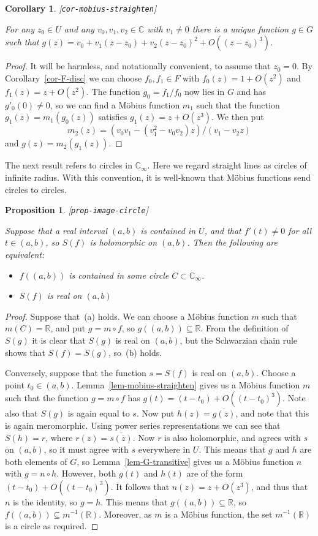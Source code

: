 \documentclass[reqno]{amsart}
\newcommand{\lbl}[1]{\label{#1}\textup{[\texttt{#1}]}\par}
\newcommand{\lbl}{\label}
\newcommand{\R}         {{\mathbb{R}}}
\newcommand{\C}         {{\mathbb{C}}}
\newcommand{\ov}[1]     {\overline{#1}}
\newcommand{\sse}       {\subseteq}
\renewcommand{\:}{\colon}
\newtheorem{proposition}[theorem]{Proposition}
\newtheorem{corollary}[theorem]{Corollary}
\theoremstyle{definition}
\begin{document}
\begin{corollary}\lbl{cor-mobius-straighten}
 For any $z_0\in U$ and any $v_0,v_1,v_2\in\C$ with $v_1\neq 0$ there
 is a unique function $g\in G$ such that
 $g(z)=v_0+v_1(z-z_0)+v_2(z-z_0)^2+O((z-z_0)^3)$.
\end{corollary}
\begin{proof}
 It will be harmless, and notationally convenient, to assume that
 $z_0=0$.  By Corollary~\ref{cor-F-disc} we can choose
 $f_0,f_1\in F$ with $f_0(z)=1+O(z^2)$ and $f_1(z)=z+O(z^2)$.  The
 function $g_0=f_1/f_0$ now lies in $G$ and has $g'_0(0)\neq 0$, so we
 can find a M\"obius function $m_1$ such that the function
 $g_1(z)=m_1(g_0(z))$ satisfies $g_1(z)=z+O(z^3)$.  We then put
 \[ m_2(z)=(v_0v_1-(v_1^2-v_0v_2)z)/(v_1-v_2z) \]
 and $g(z)=m_2(g_1(z))$.
\end{proof}

The next result refers to circles in $\C_\infty$.  Here we regard
straight lines as circles of infinite radius.  With this convention,
it is well-known that M\"obius functions send circles to circles.
\begin{proposition}\lbl{prop-image-circle}
 Suppose that a real interval $(a,b)$ is contained in $U$, and that
 $f'(t)\neq 0$ for all $t\in(a,b)$, so $S(f)$ is holomorphic on
 $(a,b)$.  Then the following are equivalent:
 \begin{itemize}
  \item[(a)] $f((a,b))$ is contained in some circle
   $C\subset\C_\infty$.
  \item[(b)] $S(f)$ is real on $(a,b)$
 \end{itemize}
\end{proposition}
\begin{proof}
 Suppose that~(a) holds.  We can choose a M\"obius function $m$ such
 that $m(C)=\R$, and put $g=m\circ f$, so $g((a,b))\sse\R$.  From the
 definition of $S(g)$ it is clear that $S(g)$ is real on $(a,b)$, but
 the Schwarzian chain rule shows that $S(f)=S(g)$, so~(b) holds.

 Conversely, suppose that the function $s=S(f)$ is real on $(a,b)$.
 Choose a point $t_0\in(a,b)$.  Lemma~\ref{lem-mobius-straighten}
 gives us a M\"obius function $m$ such that the function $g=m\circ f$
 has $g(t)=(t-t_0)+O((t-t_0)^3)$.  Note also that $S(g)$ is again
 equal to $s$.  Now put $h(z)=\ov{g(\ov{z})}$, and note that this is
 again meromorphic.  Using power series representations we can see
 that $S(h)=r$, where $r(z)=\ov{s(\ov{z})}$.  Now $r$ is also
 holomorphic, and agrees with $s$ on $(a,b)$, so it must agree with
 $s$ everywhere in $U$.  This means that $g$ and $h$ are both elements
 of $G$, so Lemma~\ref{lem-G-transitive} gives us a M\"obius
 function $n$ with $g=n\circ h$.  However, both $g(t)$ and $h(t)$ are
 of the form $(t-t_0)+O((t-t_0)^3)$.  It follows that $n(z)=z+O(z^3)$,
 and thus that $n$ is the identity, so $g=h$.  This means that
 $g((a,b))\sse\R$, so $f((a,b))\sse m^{-1}(\R)$.  Moreover, as $m$ is
 a M\"obius function, the set $m^{-1}(\R)$ is a circle as required.
\end{proof}
\end{document}
